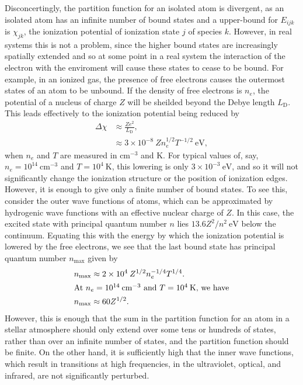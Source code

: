 \newslide

Disconcertingly, the partition function for an isolated atom is
divergent, as an isolated atom has an infinite number of bound states and
a upper-bound for $E_{ijk}$ is $\chi_{jk}$, the ionization potential of
ionization state $j$ of species $k$. However, in real systems this is
not a problem, since the higher bound states are increasingly spatially
extended and so at some point in a real system the interaction of the
electron with the enviroment will cause these states to cease to be
bound. For example, in an ionized gas, the presence of free electrons
causes the outermost states of an atom to be unbound. If the density of
free electrons is $n_e$, the potential of a nucleus of charge $Z$ will
be sheilded beyond the Debye length $L_\mathrm{D}$. This leads
effectively to the ionization potential being reduced by
\begin{align}
\Delta\chi &\approx \frac{Ze^2}{L_\mathrm{D}},\\
&\approx
3 \times 10^{-8}\:
Z n_e^{1/2}
T^{-1/2}~\mathrm{eV},
\end{align}
when $n_e$ and $T$ are measured in $\mathrm{cm^{-3}}$ and K. For typical
values of, say, $n_e = 10^{14}\:\mathrm{cm^{-3}}$ and $T =
10^4\:\mathrm{K}$, this lowering is only $3 \times 10^{-3}~\mathrm{eV}$,
and so it will not significantly change the ionization structure or the
position of ionization edges. However, it is enough to give only a
finite number of bound states. To see this, consider the outer wave
functions of atoms, which can be approximated by hydrogenic wave
functions with an effective nuclear charge of $Z$. In this case, the
excited state with principal quantum number $n$ lies
$13.6Z^2/n^2~\mathrm{eV}$ below the continuum. Equating this with the
energy by which the ionization potential is lowered by the free
electrons, we see that the last bound state has principal quantum number
$n_\mathrm{max}$ given by
\begin{align}
n_\mathrm{max} &\approx 2 \times 10^4\: Z^{1/2}n_e^{-1/4}T^{1/4}.\\
\intertext{At $n_e = 10^{14}\:\mathrm{cm^{-3}}$ and $T = 10^4\:\mathrm{K}$, we have}
n_\mathrm{max} &\approx 60 Z^{1/2}.
\end{align}
However, this is enough that the sum in the partition function for an
atom in a stellar atmosphere should only extend over some tens or
hundreds of states, rather than over an infinite number of states, and
the partition function should be finite. On the other hand, it is
sufficiently high that the inner wave functions, which result in
transitions at high frequencies, in the ultraviolet, optical, and
infrared, are not significantly perturbed.

